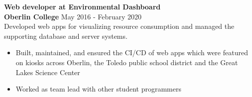 \documentclass[margin]{res}
\newcommand\rurl[1]{%
  \href{http://#1}{\nolinkurl{#1}}%
}
\begin{document}
\begin{resume}
\textbf{Web developer at Environmental Dashboard}\\
\textbf{Oberlin College} \hfill        May 2016 - February 2020\\
Developed web apps for visualizing resource consumption and managed the supporting database and server systems.

  \begin{itemize}
    \item Built, maintained, and ensured the CI/CD of web apps which were featured on kiosks across Oberlin, the Toledo public school district and the Great Lakes Science Center %
    \item Worked as team lead with other student programmers%
  \end{itemize}


\end{resume}
\end{document}
